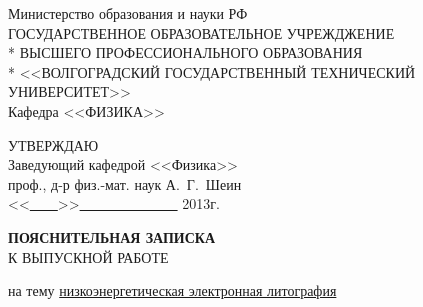 \begin{titlepage}
    \begin{center}
    Министерство образования и науки РФ \\
    \vspace{.5cm}
    ГОСУДАРСТВЕННОЕ ОБРАЗОВАТЕЛЬНОЕ УЧРЕЖДЖЕНИЕ\\*
    ВЫСШЕГО ПРОФЕССИОНАЛЬНОГО ОБРАЗОВАНИЯ\\*
    <<ВОЛГОГРАДСКИЙ ГОСУДАРСТВЕННЫЙ ТЕХНИЧЕСКИЙ УНИВЕРСИТЕТ>>\\
    \vspace{.5cm}
    Кафедра <<ФИЗИКА>>
    \vspace{.5cm}
    \end{center}
    \begin{flushright}
        УТВЕРЖДАЮ\\
        Заведующий кафедрой <<Физика>>\\
        проф., д-р физ.-мат. наук А.~Г.~Шеин\\
        \vspace{1cm}
        <<\underline{\ \ \ \ }>>\underline{\ \ \ \ \ \ \ \ \ \ \ \ \ \ } 2013г.
    \end{flushright}
    
    \vspace{.5em}

    \begin{center}
    \LARGE \textbf{ПОЯСНИТЕЛЬНАЯ ЗАПИСКА} \\
    \large К ВЫПУСКНОЙ РАБОТЕ
    \end{center}

    \vspace{.5em}

    \begin{center}
    на тему \underline{низкоэнергетическая электронная литография}
    \end{center}

    \vspace{.5em}


\end{titlepage}
